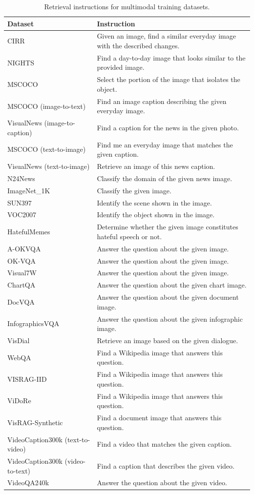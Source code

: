 \begin{table}[htbp]
\centering
\begin{tabularx}{\textwidth}{p{3cm} X}
\toprule[.1em]
\textbf{Dataset} & \textbf{Instruction} \\
\midrule
CIRR & Given an image, find a similar everyday image with the described changes. \\
NIGHTS & Find a day-to-day image that looks similar to the provided image. \\
MSCOCO & Select the portion of the image that isolates the object. \\
MSCOCO (image-to-text) & Find an image caption describing the given everyday image. \\
VisualNews (image-to-caption) & Find a caption for the news in the given photo. \\
MSCOCO (text-to-image) & Find me an everyday image that matches the given caption. \\
VisualNews (text-to-image) & Retrieve an image of this news caption. \\
N24News & Classify the domain of the given news image. \\
ImageNet\_1K & Classify the given image. \\
SUN397 & Identify the scene shown in the image. \\
VOC2007 & Identify the object shown in the image. \\
HatefulMemes & Determine whether the given image constitutes hateful speech or not. \\
A-OKVQA & Answer the question about the given image. \\
OK-VQA & Answer the question about the given image. \\
Visual7W & Answer the question about the given image. \\
ChartQA & Answer the question about the given chart image. \\
DocVQA & Answer the question about the given document image. \\
InfographicsVQA & Answer the question about the given infographic image. \\
VisDial & Retrieve an image based on the given dialogue. \\
WebQA & Find a Wikipedia image that answers this question. \\
VISRAG-IID & Find a Wikipedia image that answers this question. \\
ViDoRe & Find a Wikipedia image that answers this question. \\
VisRAG-Synthetic & Find a document image that answers this question. \\
VideoCaption300k (text-to-video) & Find a video that matches the given caption. \\
VideoCaption300k (video-to-text) & Find a caption that describes the given video. \\
VideoQA240k & Answer the question about the given video. \\
\bottomrule[.1em]
\end{tabularx}
\caption{Retrieval instructions for multimodal training datasets.}
\label{tab:train_instructions_multimodal}
\end{table}